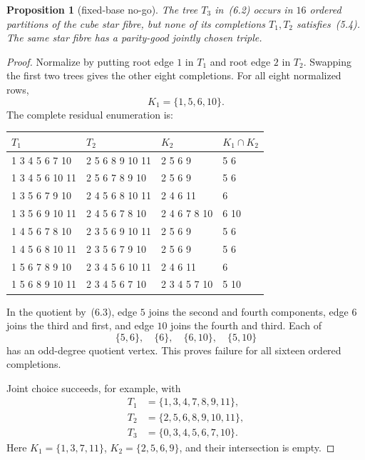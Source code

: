 \documentclass[11pt]{article}
\newtheorem{proposition}[theorem]{Proposition}
\theoremstyle{definition}
\theoremstyle{remark}
\newcommand{\1}{\mathbf 1}
\begin{document}
\begin{proposition}[fixed-base no-go]\label{prop:cube}
The tree \(T_3\) in~(6.2) occurs in \(16\) ordered partitions of the cube
star fibre, but none of its completions \(T_1,T_2\) satisfies~(5.4).
The same star fibre has a parity-good jointly chosen triple.
\end{proposition}

\begin{proof}
Normalize by putting root edge \(1\) in \(T_1\) and root edge \(2\) in
\(T_2\).  Swapping the first two trees gives the other eight completions.
For all eight normalized rows,
\[
 K_1=\{1,5,6,10\}.
\]
The complete residual enumeration is:
\begin{center}
\small
\begin{tabular}{@{}p{}p{}p{}l@{}}
\toprule
\(T_1\)&\(T_2\)&\(K_2\)&\(K_1\cap K_2\)\\
\midrule
1 3 4 5 6 7 10&2 5 6 8 9 10 11&2 5 6 9&5 6\\
1 3 4 5 6 10 11&2 5 6 7 8 9 10&2 5 6 9&5 6\\
1 3 5 6 7 9 10&2 4 5 6 8 10 11&2 4 6 11&6\\
1 3 5 6 9 10 11&2 4 5 6 7 8 10&2 4 6 7 8 10&6 10\\
1 4 5 6 7 8 10&2 3 5 6 9 10 11&2 5 6 9&5 6\\
1 4 5 6 8 10 11&2 3 5 6 7 9 10&2 5 6 9&5 6\\
1 5 6 7 8 9 10&2 3 4 5 6 10 11&2 4 6 11&6\\
1 5 6 8 9 10 11&2 3 4 5 6 7 10&2 3 4 5 7 10&5 10\\
\bottomrule
\end{tabular}
\end{center}
In the quotient by~(6.3), edge \(5\) joins the second and fourth
components, edge \(6\) joins the third and first, and edge \(10\) joins
the fourth and third.  Each of
\[
 \{5,6\},\quad\{6\},\quad\{6,10\},\quad\{5,10\}
\]
has an odd-degree quotient vertex.  This proves failure for all sixteen
ordered completions.

Joint choice succeeds, for example, with
\[
\begin{aligned}
T_1&=\{1,3,4,7,8,9,11\},\\
T_2&=\{2,5,6,8,9,10,11\},\\
T_3&=\{0,3,4,5,6,7,10\}.
\end{aligned}
\]
Here \(K_1=\{1,3,7,11\}\), \(K_2=\{2,5,6,9\}\), and their intersection is
empty.
\end{proof}
\end{document}
